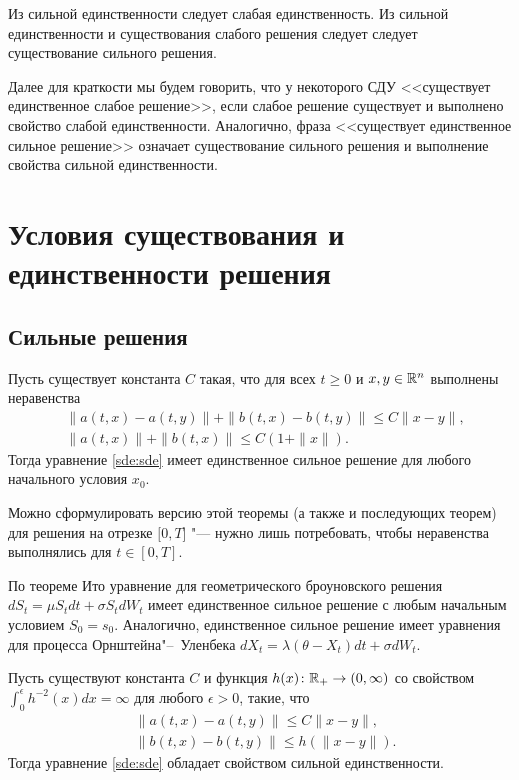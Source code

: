 \begin{theorem}
\label{sde:t:yw-1}
Из сильной единственности следует слабая единственность.
Из сильной единственности и существования слабого решения следует следует существование сильного решения.
\end{theorem}

Далее для краткости мы будем говорить, что у некоторого СДУ <<существует единственное слабое решение>>, если слабое решение существует и выполнено свойство слабой единственности.
Аналогично, фраза <<существует единственное сильное решение>> означает существование сильного решения и выполнение свойства сильной единственности.


\section{Условия существования и единственности решения}
\subsection{Сильные решения}

\begin{theorem}[К.~Ито]
Пусть существует константа $C$ такая, что для всех $t\ge 0$ и $x,y\in \mathbb{R}^n$ выполнены неравенства
\begin{align*}
&\|a(t,x) - a(t,y)\| + \|b(t,x) - b(t,y)\| \le C \|x-y\|,\\
&\|a(t,x)\| + \|b(t,x)\| \le C(1+\|x\|).
\end{align*}
Тогда уравнение \eqref{sde:sde} имеет единственное сильное решение для любого начального условия $x_0$.
\end{theorem}

\begin{remark}
Можно сформулировать версию этой теоремы (а также и последующих теорем) для решения на отрезке $[0,T$] "--- нужно лишь потребовать, чтобы неравенства выполнялись для $t\in[0,T]$.
\end{remark}

\begin{example}
По теореме Ито уравнение для геометрического броуновского решения $d S_t = \mu S_t dt + \sigma S_t dW_t$  имеет единственное сильное решение  с любым начальным условием $S_0=s_0$.
Аналогично, единственное сильное решение имеет уравнения для процесса Орнштейна"--~Уленбека $d X_t = \lambda(\theta- X_t) dt + \sigma dW_t$.
\end{example}

\begin{theorem}
\label{sde:t:yw-2}
Пусть существуют константа $C$ и функция $h(x)\colon \mathbb{R}_+\to(0,\infty)$ со свойством $\int_0^\epsilon h^{-2}(x) dx = \infty$ для любого $\epsilon >0$, такие, что
\begin{align*}
&\|a(t,x) - a(t,y)\| \le C\|x-y\|,\\
&\|b(t,x) - b(t,y)\| \le h(\|x-y\|).
\end{align*}
Тогда уравнение \eqref{sde:sde} обладает свойством сильной единственности.
\end{theorem}

